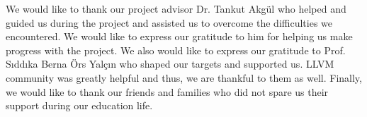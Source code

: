 \vspace*{-6pt}
We would like to thank our project advisor Dr. Tankut Akgül who helped and guided us during the project and assisted us to overcome the difficulties we encountered. We would like to express our gratitude to him for helping us make progress with the project. We also would like to express our gratitude to Prof. Sıddıka Berna Örs Yalçın who shaped our targets and supported us. LLVM community was greatly helpful and thus, we are thankful to them as well. Finally, we would like to thank our friends and families who did not spare us their support during our education life.




